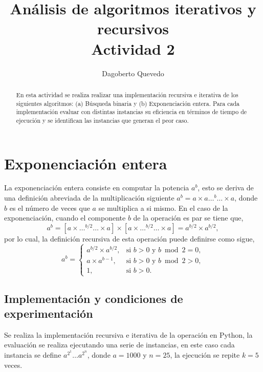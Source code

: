 \documentclass[letterpaper,11pt]{article}
\begin{document}
\title{Análisis de algoritmos iterativos y recursivos\\\large Actividad 2}
\author{Dagoberto Quevedo}
\maketitle

\begin{abstract}
En esta actividad se realiza realizar una implementación recursiva e iterativa de los siguientes algoritmos: (a) Búsqueda binaria y (b) Exponenciación entera. Para cada implementación evaluar con distintas instancias su eficiencia en términos de tiempo de ejecución y se identifican las instancias que generan el peor caso.
\end{abstract}

\section{Exponenciación entera}

La exponenciación entera consiste en computar la potencia $a^b$, esto se deriva de una definición abreviada de la multiplicación siguiente $a^b=a\times a \dots^b \dots \times a$, donde $b$ es el número de veces que $a$ se multiplica a si mismo. En el caso de la exponenciación, cuando el componente $b$ de la operación es par se tiene que,
\begin{equation}
	a^b = [a \times \dots ^{b/2} \dots \times a] \times [a \times \dots ^{b/2} \dots \times a]  = a^{b/2} \times a^{b/2},
\end{equation}
por lo cual, la definición recursiva de esta operación puede definirse como sigue,
\[
    a^b= 
\begin{cases}
    a^{b/2} \times a^{b/2}	,& \text{si } b> 0 \text{ y }  b \bmod 2 = 0, \\
    a\times a^{b-1}		,& \text{si } b> 0 \text{ y }  b \bmod 2 > 0, \\
    1					,& \text{si } b>0.
\end{cases}
\]
\subsection{Implementación y condiciones de experimentación}
Se realiza la implementación recursiva e iterativa de la operación en Python, la evaluación se realiza ejecutando una serie de instancias, en este caso cada instancia se define $a^{2^1} \dots a^{2^n}$, donde $a=1000$ y $n=25$, la ejecución se repite $k=5$ veces.
\end{document}

